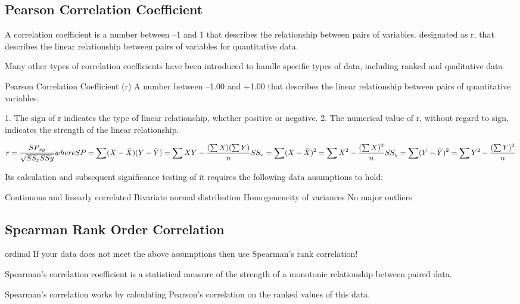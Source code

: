 \subsection{Pearson Correlation Coefficient}

A correlation coefficient is a number between –1 and 1 that describes the relationship between pairs of variables. designated as r, that describes the linear relationship between pairs of variables for quantitative data. 

Many other types of correlation coefficients have been introduced to handle specific types of data, including ranked and qualitative data

Pearson Correlation Coefficient (r)
A number between –1.00 and +1.00 that describes the linear relationship between pairs of quantitative variables.

1. The sign of r indicates the type of linear relationship, whether positive or negative. 2. The numerical value of r, without regard to sign, indicates the strength of the
linear relationship.

\begin{equation}
r = \frac{SP_{xy}}{\sqrt{SS_{x}SS{y}}}\\
where SP = \sum(X-\bar{X})(Y-\bar{Y}) = \sum XY - \frac{(\sum X)(\sum Y)}{n}\\
SS_{x} = \sum (X - \bar{X})^{2} = \sum X^{2} - \frac{(\sum X)^{2}}{n}
SS_{y} = \sum (Y - \bar{Y})^{2} = \sum Y^{2} - \frac{(\sum Y)^{2}}{n}
\label{eq: correlation coefficient}
\end{equation}

Its calculation and subsequent significance testing of it requires the following data assumptions to hold:

Continuous and linearly correlated
Bivariate normal distribution
Homogeneneity of variances
No major outliers

\subsection{Spearman Rank Order Correlation}

ordinal 
If your data does not meet the above assumptions then use Spearman’s rank correlation!

Spearman’s correlation coefficient is a statistical measure of the strength of a monotonic relationship between paired data.

Spearman’s correlation works by calculating Pearson’s correlation on the ranked values of this data.

